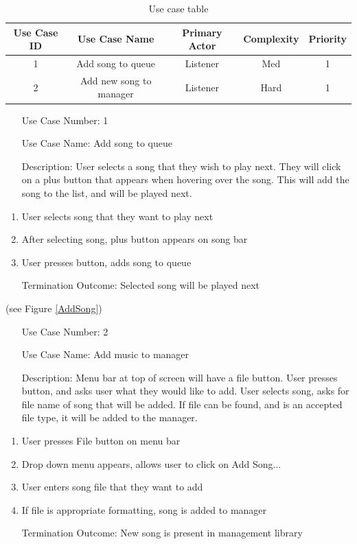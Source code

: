 \documentclass[10pt,conference,onecolumn,compsoc]{IEEEtran}
\begin{document}
\begin{table}
\centering
\begin{tabular}{|c|c|c|c|c|}
\hline
Use Case ID & Use Case Name & Primary Actor & Complexity & Priority \\
\hline \hline
1 & Add song to queue & Listener & Med & 1\\
\hline
2 & Add new song to manager & Listener & Hard & 1\\
\hline

\end{tabular}
\caption{Use case table}
\label{tab:useCaseIndex}
\end{table}


\begin{itemize}
\item[Use Case Number:] 1
\item[Use Case Name:] Add song to queue
\item[Description:] User selects a song that they wish to play next. They will click on a plus button that appears when hovering over the song. This will add the song to the list, and will be played next.
\end{itemize}

\begin{enumerate}
\item User selects song that they want to play next
\item After selecting song, plus button appears on song bar
\item User presses button, adds song to queue
\item[Termination Outcome:] Selected song will be played next
\end{enumerate}

(see Figure \ref{AddSong})

\begin{itemize}
\item[Use Case Number:] 2
\item[Use Case Name:] Add music to manager
\item[Description:] Menu bar at top of screen will have a file button. User presses button, and asks user what they would like to add. User selects song, asks for file name of song that will be added. If file can be found, and is an accepted file type, it will be added to the manager.
\end{itemize}

\begin{enumerate}
\item User presses File button on menu bar
\item Drop down menu appears, allows user to click on Add Song...
\item User enters song file that they want to add
\item If file is appropriate formatting, song is added to manager
\item [Termination Outcome:] New song is present in management library
\end{enumerate}
\end{document}
